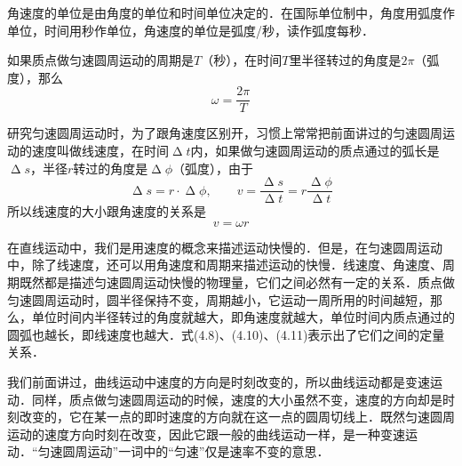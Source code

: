 角速度的单位是由角度的单位和时间单位决定的．在国际单位制中，角度用弧度作单位，时间用秒作单位，角速度的单位是弧度/秒，读作弧度每秒．

如果质点做匀速圆周运动的周期是$T$（秒），在时间$T$里半径转过的角度是$2\pi$（弧度），那么
\begin{equation}
    \omega=\frac{2\pi}{T}
\end{equation}

研究匀速圆周运动时，为了跟角速度区别开，习惯上常常把前面讲过的匀速圆周运动的速度叫做线速度，在时间$\upDelta t$内，如果做匀速圆周运动的质点通过的弧长是$\upDelta s$，半径$r$转过的角度是$\upDelta \phi$（弧度），由于
\[\upDelta s=r\cdot \upDelta \phi, \qquad v=\frac{\upDelta s}{\upDelta t}=r\frac{\upDelta \phi}{\upDelta t} \]
所以线速度的大小跟角速度的关系是
\begin{equation}
    v=\omega r
\end{equation}

在直线运动中，我们是用速度的概念来描述运动快慢的．但是，在匀速圆周运动中，除了线速度，还可以用角速度和周期来描述运动的快慢．线速度、角速度、周期既然都是描述匀速圆周运动快慢的物理量，它们之间必然有一定的关系．质点做匀速圆周运动时，圆半径保持不变，周期越小，它运动一周所用的时间越短，那么，单位时间内半径转过的角度就越大，即角速度就越大，单位时间内质点通过的圆弧也越长，即线速度也越大．式(4.8)、(4.10)、(4.11)表示出了它们之间的定量关系．

我们前面讲过，曲线运动中速度的方向是时刻改变的，所以曲线运动都是变速运动．同样，质点做匀速圆周运动的时候，速度的大小虽然不变，速度的方向却是时刻改变的，它在某一点的即时速度的方向就在这一点的圆周切线上．既然匀速圆周运动的速度方向时刻在改变，因此它跟一般的曲线运动一样，是一种变速运动．“匀速圆周运动”一词中的“匀速”仅是速率不变的意思．

